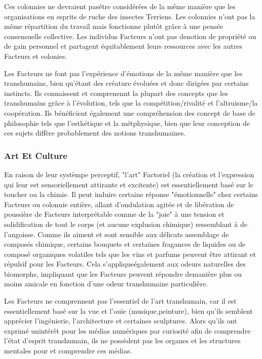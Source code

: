 Ces colonnies ne devraient pasêtre considérées de la même manière que les organisations en esprits de ruche des insectes Terriens. Les colonnies n'ont pas la même répartition du travail mais fonctionne plutôt grâce à une pensée consensuelle collective. Les individus Facteurs n'ont pas denotion de propriété ou de gain personnel et partagent équitablement leurs ressources avec les autres Facteurs et colonies. 

Les Facteurs ne font pas l'expérience d'émotions de la même manière que les transhumains, bien qu'étant des créature évoluées et donc dirigées par certains instincts. Ils connaissent et comprenennt la plupart des concepts que les transhumains grâce à l'évolution, tels que la compétition/rivalité et l'altruisme/la coopération. Ils bénéficient également une compréhension des concept de base de philosophie tels que l'esthétique et la métphysique, bien que leur conception de ces sujets diffère probablement des notions transhumaines. 

\subsubsection{Art Et Culture } 

En raison de leur systèmpe perceptif, "l'art" Factoriel (la création et l'expression qui leur est sensoriellement attirante et excitente) est essentiellement basé sur le toucher ou la chimie. Il peut induire certaine réponse "émotionnelle" chez certains Facteurs ou colonnie entière, allant d'ondulation agitée et de libération de poussière de Facteurs interprétable comme de la "joie" à une tension et solidification de tout le corps (et aucune explusion chimique) ressemblant à de l'angoisse. Comme ils aiment et sont sensible aux délicats assemblage de composés chimique, certains bouquets et certaines fragances de liquides ou de composé organiques volatiles tels que les vins et parfums peuvent être attirant et répulsif pour les Facteurs. Cela s'appliqueégalement aux odeurs naturelles des biomorphs, impliquant que les Facteurs peuvent répondre demanière plus ou moins amicale en fonction d'une odeur transhumaine particulière. 

Les Facteurs ne comprennent pas l'essentiel de l'art transhumain, car il est essentiellement basé sur la vue et l'ouïe (musique,peinture), bien qu'ils semblent apprécier l'ingénierie, l'architecture et certaines sculptures. Alors qu'ils ont exprimé unintérêt pour les médias numériques par curiosité afin de comprendre l'état d'esprit transhumain, ils ne possèdent pas les organes et les structures mentales pour et comprendre ces médias. 


